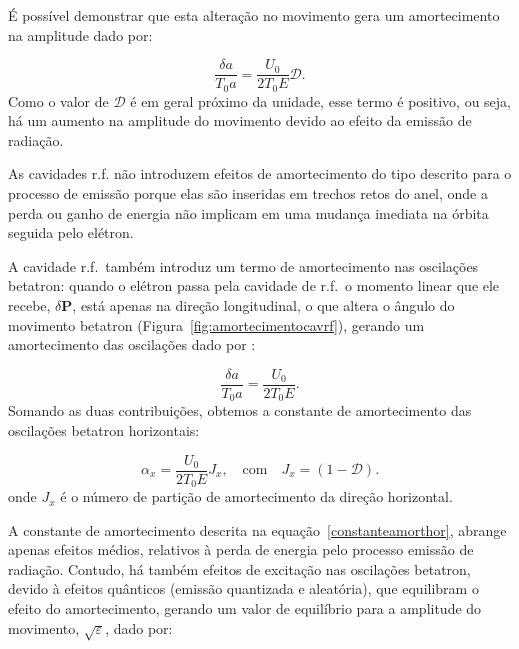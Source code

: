 É possível demonstrar que esta alteração no movimento gera um amortecimento na amplitude dado por:

\begin{equation}
 \frac{\delta a}{T_0a} = \frac{U_0}{2T_0 E}\mathcal{D}.
\end{equation}
Como o valor de $\mathcal{D}$ é em geral próximo da unidade, esse termo é positivo, ou seja, há um aumento na amplitude do movimento devido ao efeito da emissão de radiação. 


As cavidades r.f. não introduzem efeitos de amortecimento do tipo descrito para o processo de emissão porque elas são inseridas em trechos retos do anel, onde a perda ou ganho de energia não implicam em uma mudança imediata na órbita seguida pelo elétron.

A cavidade r.f.~também introduz um termo de amortecimento nas oscilações betatron: quando o elétron passa pela cavidade de r.f.~o momento linear que ele recebe, $\delta \textbf{P}$, está apenas na direção longitudinal, o que altera o ângulo do movimento betatron \mbox{(Figura \ref{fig:amortecimentocavrf})}, gerando um amortecimento das oscilações dado por \cite{Sands}:

\begin{equation}
  \frac{\delta a}{T_0a} = \frac{U_0}{2T_0 E}.
\end{equation}
Somando as duas contribuições, obtemos a constante de amortecimento das oscilações betatron horizontais:

\begin{equation}\label{constanteamorthor}
\alpha_x =  \frac{U_0}{2T_0 E}J_x , \quad \text{com} \quad J_x =(1-\mathcal{D}).
\end{equation}
onde $J_x$ é o número de partição de amortecimento da direção horizontal.

A constante de amortecimento descrita na \mbox{equação \ref{constanteamorthor}}, abrange apenas efeitos médios, relativos à perda de energia pelo processo emissão de radiação. Contudo, há também efeitos de excitação nas oscilações betatron, devido à efeitos quânticos (emissão quantizada e aleatória), que equilibram o efeito do amortecimento, gerando um valor de equilíbrio para a amplitude do movimento, $\sqrt{\varepsilon}$, dado por:

